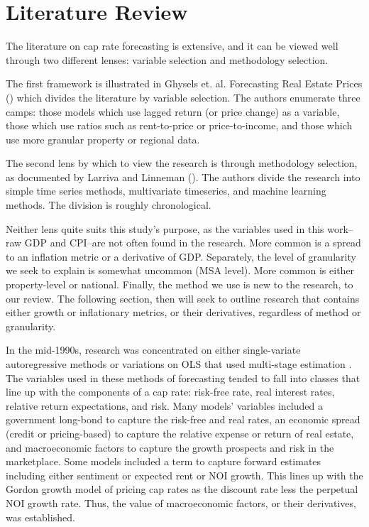 \documentclass[jrfm,article,submit,oneauthor,pdftex]{Definitions/mdpi}
\begin{document}
\section{Literature Review}

The literature on cap rate forecasting is extensive, and it can be viewed well through two different lenses: variable selection and methodology selection. 

The first framework is illustrated in Ghysels et. al. Forecasting Real Estate Prices (\citeyear{ghysels_plazzi_valkanov_torous_2013}) which divides the literature by variable selection. The authors enumerate three camps: those models which use lagged return (or price change) as a variable, those which use ratios such as rent-to-price or price-to-income, and those which use more granular property or regional data. 

The second lens by which to view the research is through methodology selection, as documented by Larriva and Linneman (\citeyear{larriva2021determinants}). The authors divide the research into simple time series methods, multivariate timeseries, and machine learning methods. The division is roughly chronological. 

Neither lens quite suits this study's purpose, as the variables used in this work--raw GDP and CPI--are not often found in the research. More common is a spread to an inflation metric or a derivative of GDP. Separately, the level of granularity we seek to explain is somewhat uncommon (MSA level). More common is either property-level or national. Finally, the method we use is new to the research, to our review. The following section, then will seek to outline research that contains either growth or inflationary metrics, or their derivatives, regardless of method or granularity.

In the mid-1990s, research was concentrated on either single-variate autoregressive methods \citep*{gau_1984,gau_1985,linneman_1986} or variations on OLS that used multi-stage estimation \citep*{case_shiller_1990,abraham_hendershott_1994}. The variables used in these methods of forecasting tended to fall into classes that line up with the components of a cap rate: risk-free rate, real interest rates, relative return expectations, and risk. Many models’ variables included a government long-bond  to capture the risk-free and real rates, an economic spread (credit or pricing-based) to capture the relative expense or return of real estate, and macroeconomic factors to capture the  growth prospects and risk in the marketplace. Some models included a term to capture forward estimates including either sentiment or expected rent or NOI growth. This lines up with the Gordon growth model of pricing cap rates as the discount rate less the perpetual NOI growth rate. Thus, the value of macroeconomic factors, or their derivatives, was established.
\end{document}
